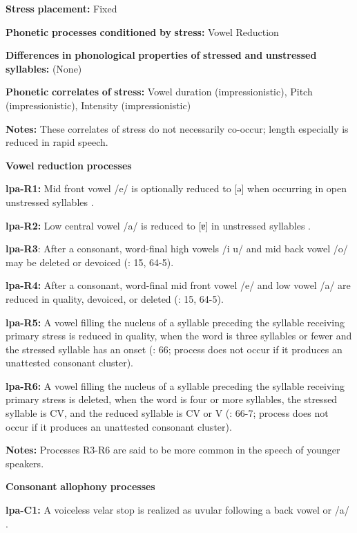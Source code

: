 \begin{styleBody}
\textbf{Stress} \textbf{placement:} Fixed

\textbf{Phonetic} \textbf{processes} \textbf{conditioned} \textbf{by} \textbf{stress:} Vowel Reduction

\textbf{Differences} \textbf{in} \textbf{phonological} \textbf{properties} \textbf{of} \textbf{stressed} \textbf{and} \textbf{unstressed} \textbf{syllables:} (None)

\textbf{Phonetic} \textbf{correlates} \textbf{of} \textbf{stress:} Vowel duration (impressionistic), Pitch (impressionistic), Intensity (impressionistic)

\textbf{Notes:} These correlates of stress do not necessarily co-occur; length especially is reduced in rapid speech.

\textbf{Vowel} \textbf{reduction} \textbf{processes}

\textbf{lpa-R1:} Mid front vowel /e/ is optionally reduced to [ə] when occurring in open unstressed syllables \citep[34]{Lacrampe2014}.

\textbf{lpa-R2:} Low central vowel /a/ is reduced to [ɐ] in unstressed syllables \citep[34-5]{Lacrampe2014}.

\textbf{lpa-R3}: After a consonant, word-final high vowels /i u/ and mid back vowel /o/ may be deleted or devoiced (\citealt{Lacrampe2014}: 15, 64-5).

\textbf{lpa-R4:} After a consonant, word-final mid front vowel /e/ and low vowel /a/ are reduced in quality, devoiced, or deleted (\citealt{Lacrampe2014}: 15, 64-5).

\textbf{lpa-R5:} A vowel filling the nucleus of a syllable preceding the syllable receiving primary stress is reduced in quality, when the word is three syllables or fewer and the stressed syllable has an onset (\citealt{Lacrampe2014}: 66; process does not occur if it produces an unattested consonant cluster).

\textbf{lpa-R6:} A vowel filling the nucleus of a syllable preceding the syllable receiving primary stress is deleted, when the word is four or more syllables, the stressed syllable is CV, and the reduced syllable is CV or V (\citealt{Lacrampe2014}: 66-7; process does not occur if it produces an unattested consonant cluster).

\textbf{Notes:} Processes R3-R6 are said to be more common in the speech of younger speakers.

\textbf{Consonant} \textbf{allophony} \textbf{processes}

\textbf{lpa-C1:} A voiceless velar stop is realized as uvular following a back vowel or /a/ \citep[19]{Lacrampe2014}.


\end{styleBody}
